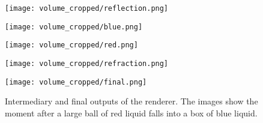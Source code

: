\begin{figure}[H]
    \centering
    \begin{minipage}[t]{.65\linewidth}
            \vspace{0pt}
            \centering
            \texttt{[image: volume\_cropped/reflection.png]}
    \end{minipage}
    
    \hspace{2pt}

    \begin{minipage}[t]{.65\linewidth}
            \vspace{0pt}
            \centering
            \texttt{[image: volume\_cropped/blue.png]}
    \end{minipage}

    \hspace{2pt}
    
    \begin{minipage}[t]{.65\linewidth}
            \vspace{0pt}
            \centering
            \texttt{[image: volume\_cropped/red.png]}
    \end{minipage}

    \hspace{2pt}
            
    
    \begin{minipage}[t]{.65\linewidth}
            \vspace{0pt}
            \centering
            \texttt{[image: volume\_cropped/refraction.png]}
    \end{minipage}

    \hspace{2pt}

    \begin{minipage}[t]{.65\linewidth}
            \vspace{0pt}
            \centering
            \texttt{[image: volume\_cropped/final.png]}
    \end{minipage}

    \hspace{2pt}
            

    \caption{Intermediary and final outputs of the renderer. The images show the moment after a large ball of red liquid falls into a box of blue liquid.}
    \label{figure volume render}
\end{figure}


\addtolength{\topmargin}{.875in}
